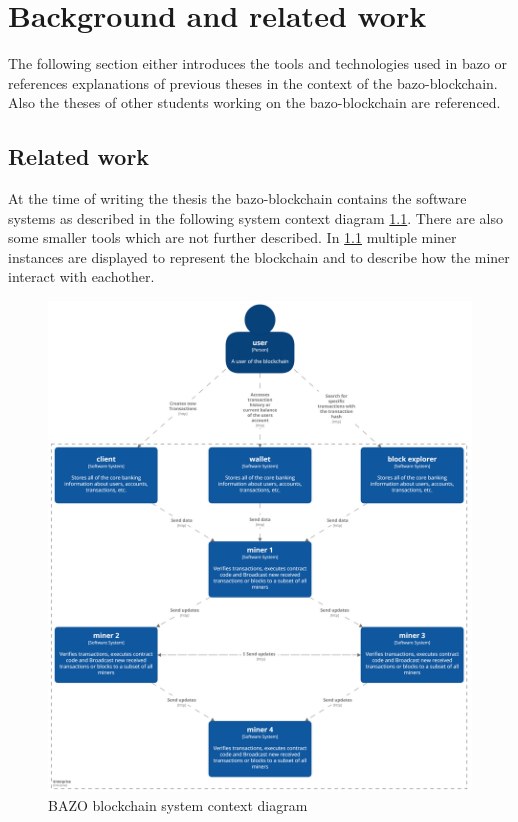 \chapter{Background and related work}
\thispagestyle{main} %
The following section either introduces the tools and technologies used in bazo or references explanations of previous theses in the context of the bazo-blockchain. Also the theses of other students working on the bazo-blockchain are referenced.
\pagebreak

\section{Related work}
At the time of writing the thesis the bazo-blockchain contains the software systems as described in the following system context diagram \ref{systemcontextdiagram}. There are also some smaller tools which are not further described. In \ref{systemcontextdiagram} multiple miner instances are displayed to represent the blockchain and to describe how the miner interact with eachother.

\vfill

\begin{figure}[H]
	\begin{center}
	\includegraphics[width=\textwidth]{./images/BAZO_System_Context}
	\caption{BAZO blockchain system context diagram}
	\label{systemcontextdiagram}
	\end{center}
\end{figure}
\pagebreak

